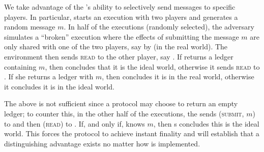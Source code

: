   \begin{proofsketch}
    We take advantage of the \adversary's ability to selectively send messages
    to specific players. In particular, \environment{} starts an execution with
    two players and generates a random message $m$. In half of the executions
    (randomly selected),  the adversary simulates a ``broken''  \perfectprot{} execution where the effects of submitting the message 
    $m$ are only shared with one of the two players, say
    \alice{} by \adversary{} (in the real world). The environment then sends
    \textsc{read} to the other player, say \bob. If \bob{} returns a ledger containing
    $m$, then
    \environment{} concludes that it is the ideal world, otherwise it sends
    \textsc{read} to \alice. If she returns a ledger with $m$, then \environment{} concludes it is in the real world, otherwise it concludes it is in the ideal world.

    The above is not sufficient since a protocol may choose to  return an
    empty ledger; to counter this, 
    in the other half of the executions, the \environment{} sends
    (\textsc{submit}, $m$) to \alice{} and then (\textsc{read}) to \bob. If, and only if, 
    \bob{} knows $m$, then \environment{}s concludes this is the ideal world.   
    This  forces the \perfectprot{}  protocol to achieve instant finality and will establish that a distinguishing advantage exists no matter how \perfectprot{} is implemented. 
  \end{proofsketch}
